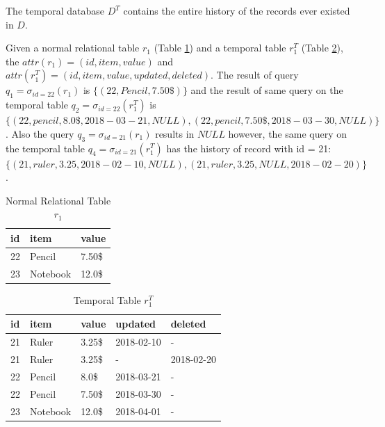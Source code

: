 The temporal database $D^T$ contains the entire history of the records ever existed in $D$.

\begin{example}
	Given a normal relational table $r_1$ (Table \ref{table:normal_relational_table}) and a temporal table $r_1^T$ (Table \ref{table:temporal_table}), the $attr(r_1) = (id, item, value)$ and $attr(r_1^T)= (id, item, value, updated, deleted)$. The result of query $q_1 = \sigma_{id = 22}(r_1)$ is $\{(22,Pencil,7.50\$)\}$ and the result of same query on the temporal table $q_2 = \sigma_{id = 22}(r_1^T)$ is $\{(22,pencil,8.0\$,2018-03-21,NULL),(22,pencil,7.50\$,2018-03-30,NULL)\}$. Also the query $q_3 = \sigma_{id = 21}(r_1)$ results in $NULL$ however, the same query on the temporal table $q_4 = \sigma_{id = 21}(r_1^T)$ has the history of record with id = 21: $\{(21,ruler,3.25,2018-02-10,NULL),(21,ruler,3.25,NULL,2018-02-20)\}$.
\label{example:temporal_table}
\end{example}

\begin{center}
\begin{table}[t]
	\centering
	\caption{Normal Relational Table $r_1$}
	\label{table:normal_relational_table}
	\begin{tabular}{p{4cm}p{4cm}p{4cm}}
		\hline
		id & item      & value  \\ \hline
		22 & Pencil    & 7.50\$ \\
		23 & Notebook & 12.0\$   \\ \hline
	\end{tabular}
\end{table}

\begin{table}[t]
	\centering
	\caption{Temporal Table $r_1^T$}
	\label{table:temporal_table}
	\begin{tabular}{p{1cm}p{2cm}p{3cm}p{3cm}p{2cm}}
		\hline
		id & item      & value  & updated  & deleted\\ \hline
		21 & Ruler    & 3.25\$  & 2018-02-10  &  - \\  
		21 & Ruler    & 3.25\$  & -  &  2018-02-20 \\
		22 & Pencil    & 8.0\$  & 2018-03-21  &  - \\
		22 & Pencil    & 7.50\$  & 2018-03-30  &  -\\
		23 & Notebook & 12.0\$  & 2018-04-01 & - \\ \hline
	\end{tabular}
\end{table} 
\end{center}

